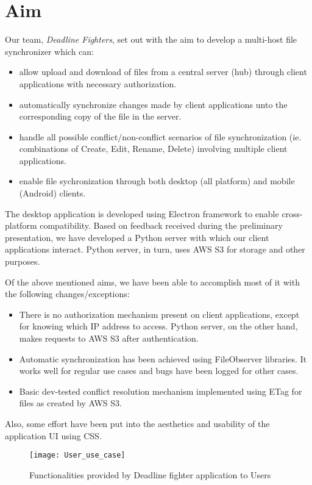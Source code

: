 \section{Aim}
Our team, \emph{Deadline Fighters}, set out with the aim to develop a multi-host file synchronizer which can:
\begin{itemize}
\item{allow upload and download of files from a central server (hub) through client applications with necessary authorization.}
\item{automatically synchronize changes made by client applications unto the corresponding copy of the file in the server.}
\item{handle all possible conflict/non-conflict scenarios of file synchronization (ie. combinations of Create, Edit, Rename, Delete) involving multiple client applications.}
\item{enable file sychronization through both desktop (all platform) and mobile (Android) clients.}
\end{itemize}

The desktop application is developed using Electron framework to enable cross-platform compatibility. Based on feedback received during the preliminary presentation, we have developed a Python server with which our client applications interact. Python server, in turn, uses AWS S3 for storage and other purposes.

Of the above mentioned aims, we have been able to accomplish most of it with the following changes/exceptions:

\begin{itemize}
	\item{There is no authorization mechanism present on client applications, except for knowing which IP address to access. Python server, on the other hand, makes requests to AWS S3 after authentication.}
	\item{Automatic synchronization has been achieved using FileObserver libraries. It works well for regular use cases and bugs have been logged for other cases.}
	\item{Basic dev-tested conflict resolution mechanism implemented using ETag for files as created by AWS S3.}
\end{itemize}

Also, some effort have been put into the aesthetics and usability of the application UI using CSS.\newline

\begin{figure}[h!]
\centering
\texttt{[image: User\_use\_case]}

\caption{Functionalities provided by Deadline fighter application to Users}
\end{figure}

